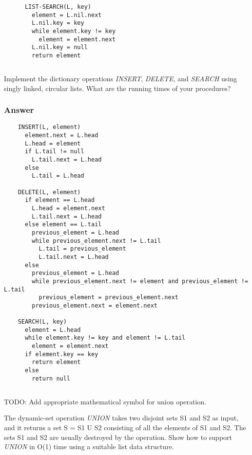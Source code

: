     \begin{verbatim}
      LIST-SEARCH(L, key)
        element = L.nil.next
        L.nil.key = key
        while element.key != key
          element = element.next
        L.nil.key = null
        return element
    \end{verbatim}


    \subsection{}

    Implement the dictionary operations \textit{INSERT}, \textit{DELETE}, and
    \textit{SEARCH} using singly linked, circular lists. What are the running
    times of your procedures?

    \subsubsection{Answer}
    \begin{verbatim}
    INSERT(L, element)
      element.next = L.head
      L.head = element
      if L.tail != null
        L.tail.next = L.head
      else
        L.tail = L.head

    DELETE(L, element)
      if element == L.head
        L.head = element.next
        L.tail.next = L.head
      else element == L.tail
        previous_element = L.head
        while previous_element.next != L.tail
          L.tail = previous_element
          L.tail.next = L.head
      else
        previous_element = L.head
        while previous_element.next != element and previous_element != L.tail
          previous_element = previous_element.next
        previous_element.next = element.next

    SEARCH(L, key)
      element = L.head
      while element.key != key and element != L.tail
        element = element.next
      if element.key == key
        return element
      else
        return null
    \end{verbatim}

    \subsection{}

    TODO: Add appropriate mathematical symbol for union operation.

    The dynamic-set operation \textit{UNION} takes two disjoint sets S1 and S2
    as input, and it returns a set S = S1 U S2 consisting of all the elements
    of S1 and S2. The sets S1 and S2 are usually destroyed by the operation.
    Show how to support \textit{UNION} in O(1) time using a suitable list data
    structure.

